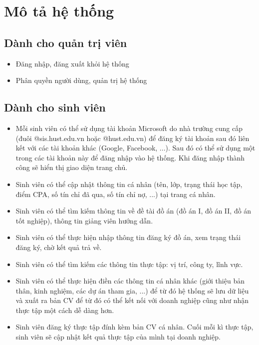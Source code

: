 \section{Mô tả hệ thống}
\subsection{Dành cho quản trị viên}
\begin{itemize}
	\item Đăng nhập, đăng xuất khỏi hệ thống
	\item Phân quyền người dùng, quản trị hệ thống
\end{itemize}
\subsection{Dành cho sinh viên}
\begin{itemize}
	\item Mỗi sinh viên có thể sử dụng tài khoản Microsoft do nhà trường cung cấp (đuôi @sis.hust.edu.vn hoặc @hust.edu.vn) để đăng ký tài khoản sau đó liên kết với các tài khoản khác (Google, Facebook, ...). Sau đó có thể sử dụng một trong các tài khoản này để đăng nhập vào hệ thống. Khi đăng nhập thành công sẽ hiển thị giao diện trang chủ.
	\item Sinh viên có thể cập nhật thông tin cá nhân (tên, lớp, trạng thái học tập, điểm CPA, số tín chỉ đã qua, số tín chỉ nợ, ...) tại trang cá nhân.
	\item Sinh viên có thể tìm kiếm thông tin về đề tài đồ án (đồ án I, đồ án II, đồ án tốt nghiệp), thông tin giảng viên hướng dẫn.
	\item Sinh viên có thể thực hiện nhập thông tin đăng ký đồ án, xem trạng thái đăng ký, chờ kết quả trả về.
	\item Sinh viên có thể tìm kiếm các thông tin thực tập: vị trí, công ty, lĩnh vực.
	\item Sinh viên có thể thực hiện điền các thông tin cá nhân khác (giới thiệu bản thân, kinh nghiệm, các dự án tham gia, ...) để từ đó hệ thống sẽ lưu dữ liệu và xuất ra bản CV để từ đó có thể kết nối với doanh nghiệp cũng như nhận thực tập một cách dễ dàng hơn.
	\item Sinh viên đăng ký thực tập đính kèm bản CV cá nhân. Cuối mỗi kì thực tập, sinh viên sẽ cập nhật kết quả thực tập của mình tại doanh nghiệp.
\end{itemize}
